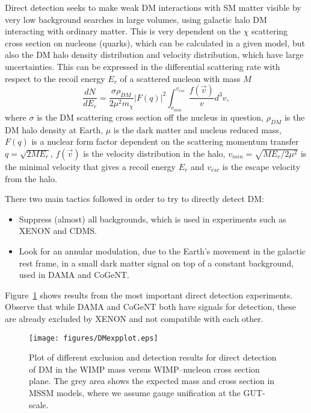 \documentclass[notes.tex]{subfiles}
\begin{document}
Direct detection seeks to make weak DM interactions with SM matter visible by very low background searches in large volumes, using galactic halo DM interacting with ordinary matter. This is very dependent on the $\chi$ scattering cross section on nucleons (quarks), which can be calculated in a given model, but also the DM halo density distribution and velocity distribution, which have large uncertainties. This can be expressed in the differential scattering rate with respect to the recoil energy $E_r$ of a scattered nucleon with mass $M$
\begin{equation}
\frac{dN}{dE_r} = \frac{\sigma \rho_{DM}}{2\mu^2 m_\chi}|F(q)|^2\int_{v_{min}}^{v_{esc}} \frac{f(\vec v)}{v}d^3v,
\end{equation}
where $\sigma$ is the DM scattering cross section off the nucleus in question, $\rho_{DM}$ is the DM halo density at Earth, $\mu$ is the dark matter and nucleus reduced mass, $F(q)$ is a nuclear form factor dependent on the scattering momentum transfer $q=\sqrt{2ME_r}$, $f(\vec v)$ is the velocity distribution in the halo, $v_{min}=\sqrt{ME_r/2\mu^2}$ is the minimal velocity that gives a recoil energy $E_r$ and $v_{esc}$ is the escape velocity from the halo.

There two main tactics followed in order to try to directly detect DM:
\begin{itemize}
\item Suppress (almost) all backgrounds, which is used in experiments such as XENON and CDMS.
\item Look for an annular modulation, due to the Earth's movement in the galactic rest frame, in a small dark matter signal on top of a constant background, used in DAMA and CoGeNT.
\end{itemize}

Figure~\ref{DD} shows results from the most important direct detection experiments. Observe that while DAMA and CoGeNT both have signals for detection, these are already excluded by XENON and not compatible with each other. 

\begin{figure}[h!]
\begin{center}
\texttt{[image: figures/DMexpplot.eps]} 
\caption{Plot of different exclusion and detection results for direct detection of DM in the WIMP mass versus WIMP--nucleon cross section plane. The grey area shows the expected mass and cross section in MSSM models, where we assume gauge unification at the GUT-scale. \label{DD}}
\end{center}
\end{figure}
\end{document}
